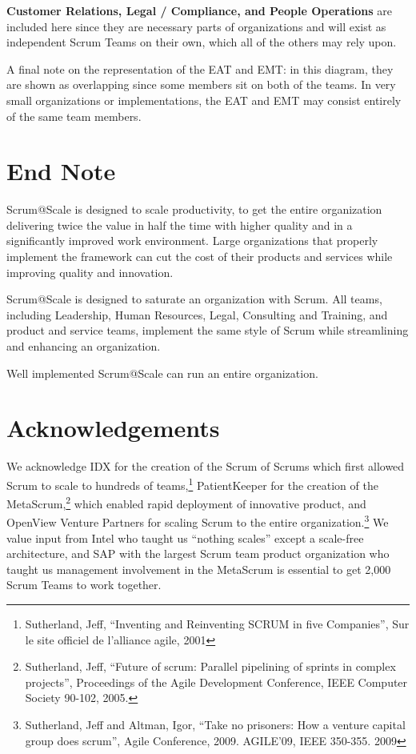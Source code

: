 \documentclass[12pt,a4paper,parskip=full]{scrartcl}
\begin{document}
\textbf{Customer Relations, Legal / Compliance, and People Operations} are included here since they are necessary parts of organizations and will exist as independent Scrum Teams on their own, which all of the others may rely upon.

A final note on the representation of the EAT and EMT: in this diagram, they are shown as overlapping since some members sit on both of the teams. In very small organizations or implementations, the EAT and EMT may consist entirely of the same team members.

\section{End Note}

Scrum@Scale is designed to scale productivity, to get the entire organization delivering twice the value in half the time with higher quality and in a significantly improved work environment. Large organizations that properly implement the framework can cut the cost of their products and services while improving quality and innovation.

Scrum@Scale is designed to saturate an organization with Scrum. All teams, including Leadership, Human Resources, Legal, Consulting and Training, and product and service teams, implement the same style of Scrum while streamlining and enhancing an organization.

Well implemented Scrum@Scale can run an entire organization.

\section{Acknowledgements}

We acknowledge IDX for the creation of the Scrum of Scrums which first allowed Scrum to scale to hundreds of teams,\footnote{Sutherland, Jeff, ``Inventing and Reinventing SCRUM in five Companies'', Sur le site officiel de l'alliance agile, 2001} PatientKeeper for the creation of the MetaScrum,\footnote{Sutherland, Jeff, ``Future of scrum: Parallel pipelining of sprints in complex projects'', Proceedings of the Agile Development Conference,  IEEE Computer Society 90-102,  2005.} which enabled rapid deployment of innovative product, and OpenView Venture Partners for scaling Scrum to the entire organization.\footnote{Sutherland, Jeff and Altman, Igor, ``Take no prisoners: How a venture capital group does scrum'', Agile Conference, 2009. AGILE'09, IEEE 350-355.  2009} We value input from Intel who taught us ``nothing scales'' except a scale-free architecture, and SAP with the largest Scrum team product organization who taught us management involvement in the MetaScrum is essential to get 2,000 Scrum Teams to work together.
\end{document}
